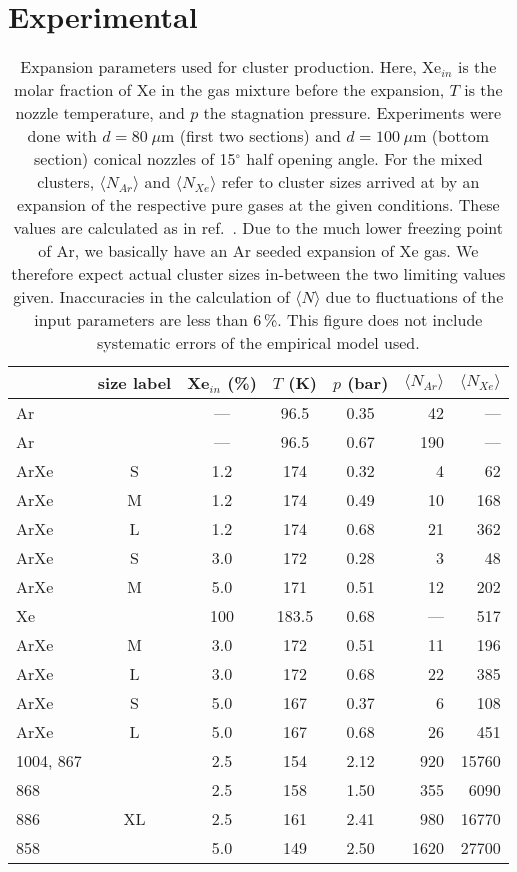 \section{Experimental}
%
\begin{table}
\caption{
Expansion parameters used for cluster production. Here, Xe$_{in}$ is the molar fraction of Xe in the gas mixture before the expansion, $T$ is the nozzle temperature, and $p$ the stagnation pressure. Experiments were done with $d = 80~\mu$m (first two sections) and $d = 100~\mu$m (bottom section) conical nozzles of 15$^\circ$ half opening angle. For the mixed clusters, $\langle N_{Ar} \rangle$ and $\langle N_{Xe} \rangle$ refer to cluster sizes arrived at by an expansion of the respective pure gases at the given conditions. These values are calculated as in ref.\ \protect{}. Due to the much lower freezing point of Ar, we basically have an Ar seeded expansion of Xe gas. We therefore expect actual cluster sizes in-between the two limiting values given. Inaccuracies in the calculation of $\langle N\rangle$ due to fluctuations of the input parameters are less than 6\,\%. This figure does not include systematic errors of the empirical model used.
}
\label{tab:cluster}

\begin{tabular}{l c c c c r r}
%
\toprule
  & size label  &  Xe$_{in}$ (\%)  &  $T$ (K)  &  $p$ (bar) & $\langle N_{Ar} \rangle$ & $\langle N_{Xe} \rangle$ \\
%
\midrule
Ar &  & --- &  96.5  & 0.35  &  42  &  --- \\
Ar &  & --- &  96.5  & 0.67  & 190  &  --- \\
ArXe & S & 1.2 &  174   & 0.32  &   4  &   62 \\
ArXe & M & 1.2 &  174   & 0.49  &  10  &  168 \\
ArXe & L & 1.2 &  174   & 0.68  &  21  &  362 \\
ArXe & S & 3.0 &  172   & 0.28  &   3  &   48 \\
ArXe & M & 5.0 &  171   & 0.51  &  12  &  202 \\
Xe &  & 100 & 183.5  & 0.68  & ---  &  517 \\     
\midrule
ArXe & M & 3.0 &  172   & 0.51  &  11  &  196 \\
ArXe & L & 3.0 &  172   & 0.68  &  22  &  385 \\
ArXe & S  & 5.0 &  167   & 0.37  &   6  &  108 \\
ArXe & L  & 5.0 &  167   & 0.68  &  26  &  451 \\
\midrule
1004, 867 &  & 2.5 &  154   & 2.12  &  920 & 15760\\
868 & & 2.5 &  158   & 1.50  &  355 &  6090\\
886 & XL & 2.5 &  161   & 2.41  &  980 & 16770\\
858 &  & 5.0 &  149   & 2.50  & 1620 & 27700\\
%
\bottomrule
\end{tabular}
\end{table}
